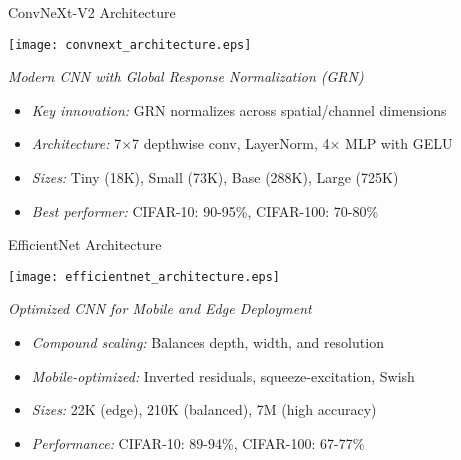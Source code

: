 \begin{slide}[\slideopts,toc={ConvNeXt}]{ConvNeXt-V2 Architecture}
  
  \centerline{\texttt{[image: convnext\_architecture.eps]}}

  \emph{Modern CNN with Global Response Normalization (GRN)}
  
  \begin{itemize}
    \item \emph{Key innovation:} GRN normalizes across spatial/channel dimensions
    
    \item \emph{Architecture:} 7×7 depthwise conv, LayerNorm, 4× MLP with GELU
    
    \item \emph{Sizes:} Tiny (18K), Small (73K), Base (288K), Large (725K)
    
    \item \emph{Best performer:} CIFAR-10: 90-95\%, CIFAR-100: 70-80\%
  \end{itemize}
  
\end{slide}

\begin{slide}[\slideopts,toc={EfficientNet}]{EfficientNet Architecture}
  
  \centerline{\texttt{[image: efficientnet\_architecture.eps]}}

  \emph{Optimized CNN for Mobile and Edge Deployment}
  
  \begin{itemize}
    \item \emph{Compound scaling:} Balances depth, width, and resolution
    
    \item \emph{Mobile-optimized:} Inverted residuals, squeeze-excitation, Swish
    
    \item \emph{Sizes:} 22K (edge), 210K (balanced), 7M (high accuracy)
    
    \item \emph{Performance:} CIFAR-10: 89-94\%, CIFAR-100: 67-77\%
  \end{itemize}
  
\end{slide}

